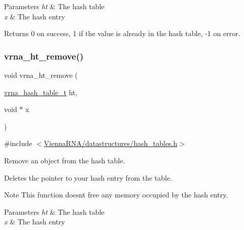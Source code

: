 \begin{DoxyParams}{Parameters}
{\em ht} & The hash table \\
\hline
{\em x} & The hash entry \\
\hline
\end{DoxyParams}
\begin{DoxyReturn}{Returns}
0 on success, 1 if the value is already in the hash table, -\/1 on error. 
\end{DoxyReturn}
\mbox{\label{group__hash__table__utils_ga1162aa0d1bd82af7420bb727a87d3e2f}} 
\subsubsection{\texorpdfstring{vrna\+\_\+ht\+\_\+remove()}{vrna\_ht\_remove()}}
{\footnotesize\ttfamily void vrna\+\_\+ht\+\_\+remove (\begin{DoxyParamCaption}\item[{\hyperlink{group__hash__table__utils_gabc7c6f41b718c8e23929e528891a89c4}{vrna\+\_\+hash\+\_\+table\+\_\+t}}]{ht,  }\item[{void $\ast$}]{x }\end{DoxyParamCaption})}



{\ttfamily \#include $<$\hyperlink{hash__tables_8h}{Vienna\+R\+N\+A/datastructures/hash\+\_\+tables.\+h}$>$}



Remove an object from the hash table. 

Deletes the pointer to your hash entry from the table.

\begin{DoxyNote}{Note}
This function doesn\textquotesingle{}t free any memory occupied by the hash entry.
\end{DoxyNote}

\begin{DoxyParams}{Parameters}
{\em ht} & The hash table \\
\hline
{\em x} & The hash entry \\
\hline
\end{DoxyParams}
\mbox{\label{group__hash__table__utils_gab90583f8f7395e735c865ad2ebdb3c29}} 
